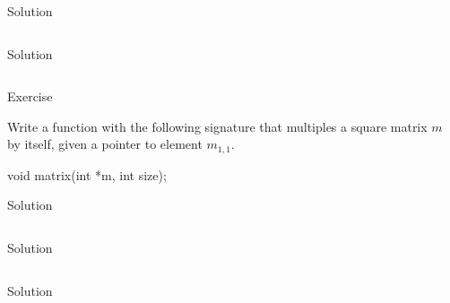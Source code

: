 \documentclass[compress]{beamer}
\begin{document}
\begin{slide}
	\begin{block}{Solution}

	\inputminted[fontsize=\scriptsize, firstline=10, lastline=25, linenos]{c}{
		\resDirectory/ls11-reverse.c
	}

	\end{block}
\end{slide}

\begin{slide}
	\begin{block}{Solution}

	\inputminted[fontsize=\scriptsize, firstline=27, linenos]{c}{
		\resDirectory/ls11-reverse.c
	}

	\end{block}
\end{slide}

\begin{slide}
	\begin{block}{Exercise}

	Write a function with the following signature that multiples a square matrix $m$ by itself, given a pointer to element $m_{1,1}$.

	\begin{terminal}
	void matrix(int *m, int size);
	\end{terminal}

	\end{block}
\end{slide}

\begin{slide}
	\begin{block}{Solution}

	\inputminted[fontsize=\scriptsize, firstline=17, lastline=28, linenos]{c}{
		\resDirectory/ls11-matrix.c
	}

	\end{block}
\end{slide}

\begin{slide}
	\begin{block}{Solution}

	\inputminted[fontsize=\scriptsize, firstline=30, lastline=38, linenos]{c}{
		\resDirectory/ls11-matrix.c
	}

	\end{block}
\end{slide}

\begin{slide}
	\begin{block}{Solution}

	\inputminted[fontsize=\scriptsize, firstline=40, lastline=48, linenos]{c}{
		\resDirectory/ls11-matrix.c
	}

	\end{block}
\end{slide}
\end{document}
